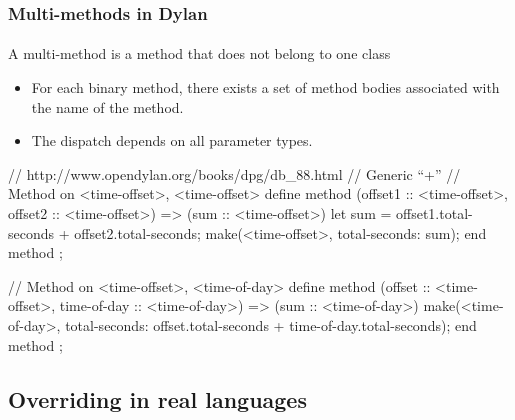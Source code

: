\documentclass{beamer}
\begin{document}
\begin{frame}[fragile]
\frametitle{Multi-methods in Dylan}
\framesubtitle{}
A multi-method is a method that does not belong to one class
\begin{itemize}
\item For each binary method, there exists
a set of method bodies associated with the name of the method.
\item The dispatch depends on all parameter types.
\end{itemize}
\begin{cplus3}
// http://www.opendylan.org/books/dpg/db_88.html
// Generic ``+'' 
// Method on <time-offset>, <time-offset>
define method \+
    (offset1 :: <time-offset>, offset2 :: <time-offset>)
=> (sum :: <time-offset>)
 let sum = offset1.total-seconds + offset2.total-seconds;
 make(<time-offset>, total-seconds: sum);
end method \+;	

// Method on <time-offset>, <time-of-day>
define method \+ 
    (offset :: <time-offset>, time-of-day :: <time-of-day>)
 => (sum :: <time-of-day>)
  make(<time-of-day>, 
       total-seconds: offset.total-seconds + time-of-day.total-seconds);
end method \+;
\end{cplus3}
\end{frame}


\subsection{Overriding in real languages}
\end{document}
